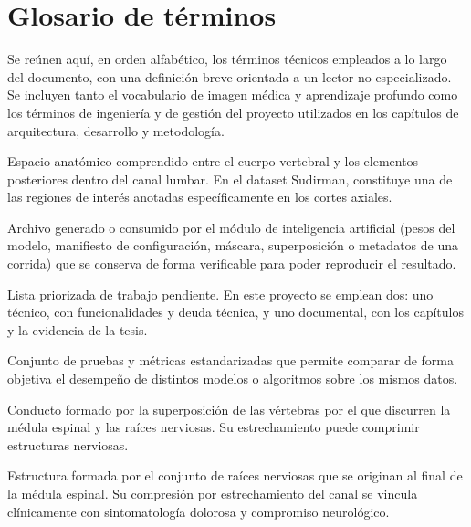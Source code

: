 \chapter{Glosario de términos}
\label{anexo:glosario-tecnico}

Se reúnen aquí, en orden alfabético, los términos técnicos empleados a lo largo del documento, con una definición breve orientada a un lector no especializado. Se incluyen tanto el vocabulario de imagen médica y aprendizaje profundo como los términos de ingeniería y de gestión del proyecto utilizados en los capítulos de arquitectura, desarrollo y metodología.

\begin{description}[leftmargin=3.8cm, style=nextline, itemsep=3pt, topsep=3pt]

    \item[AAP (Área entre elementos anterior y posterior)] Espacio anatómico comprendido entre el cuerpo vertebral y los elementos posteriores dentro del canal lumbar. En el dataset Sudirman, constituye una de las regiones de interés anotadas específicamente en los cortes axiales.

    \item[Artifact] Archivo generado o consumido por el módulo de inteligencia artificial (pesos del modelo, manifiesto de configuración, máscara, superposición o metadatos de una corrida) que se conserva de forma verificable para poder reproducir el resultado.

    \item[Backlog] Lista priorizada de trabajo pendiente. En este proyecto se emplean dos: uno técnico, con funcionalidades y deuda técnica, y uno documental, con los capítulos y la evidencia de la tesis.

    \item[Benchmark] Conjunto de pruebas y métricas estandarizadas que permite comparar de forma objetiva el desempeño de distintos modelos o algoritmos sobre los mismos datos.

    \item[Canal espinal o canal raquídeo] Conducto formado por la superposición de las vértebras por el que discurren la médula espinal y las raíces nerviosas. Su estrechamiento puede comprimir estructuras nerviosas.

    \item[Cauda equina (cola de caballo)] Estructura formada por el conjunto de raíces nerviosas que se originan al final de la médula espinal. Su compresión por estrechamiento del canal se vincula clínicamente con sintomatología dolorosa y compromiso neurológico.


\end{description}
